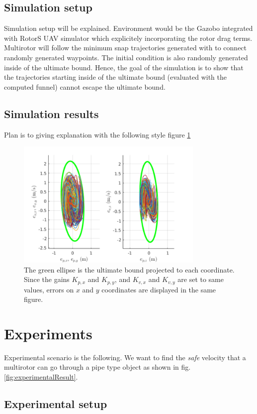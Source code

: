 \documentclass[letterpaper, 10 pt, conference]{ieeeconf}  %
\begin{document}
\subsection{Simulation setup}
Simulation setup will be explained. Environment would be the Gazobo integrated with RotorS UAV simulator which explicitely incorporating the rotor drag terms.
Multirotor will follow the minimum snap trajectories generated with to connect randomly generated waypoints.
The initial condition is also randomly generated inside of the ultimate bound. 
Hence, the goal of the simulation is to show that the trajectories starting inside of the ultimate bound (evaluated with the computed funnel) cannot escape the ultimate bound.
\subsection{Simulation results}
Plan is to giving explanation with the following style figure \ref{fig:simulation}
\begin{figure}
\centering
\includegraphics[width=9cm]{monteCarlo.pdf}
\caption{The green ellipse is the ultimate bound projected to each coordinate. 
Since the gains $K_{p,x}$ and $K_{p,y}$, and $K_{v,x}$ and $K_{v,y}$ are set to same values, errors on $x$ and $y$ coordinates are displayed in the same figure.} \label{fig:simulation}
\end{figure}

\section{Experiments}
Experimental scenario is the following. 
We want to find the \textit{safe} velocity that a multirotor can go through a pipe type object as shown in fig. \ref{fig:experimentalResult}.

\subsection{Experimental setup}
\end{document}
